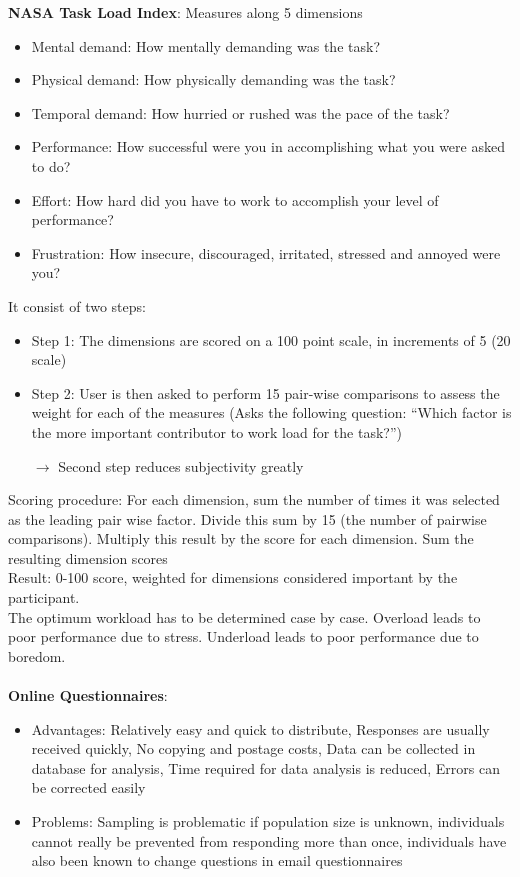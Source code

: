 \textbf{NASA Task Load Index}: Measures along 5 dimensions
\begin{itemize}
\item Mental demand: How mentally demanding was the task?
\item Physical demand: How physically demanding was the task?
\item Temporal demand: How hurried or rushed was the pace of the task?
\item Performance: How successful were you in accomplishing what you were asked to do?
\item Effort: How hard did you have to work to accomplish your level of performance?
\item Frustration: How insecure, discouraged, irritated, stressed and annoyed were you?
\end{itemize}
It consist of two steps:
\begin{itemize}
\item Step 1: The dimensions are scored on a 100 point scale, in increments of 5 (20 scale)
\item Step 2: User is then asked to perform 15 pair-wise comparisons to assess the weight for each of the measures (Asks the following question: ``Which factor is the more
important contributor to work load for the task?'')
\item[$\rightarrow$] Second step reduces subjectivity greatly
\end{itemize}
Scoring procedure: For each dimension, sum the number of times it was selected as the leading pair wise factor. Divide this sum by 15 (the number of pairwise comparisons). Multiply this result by the score for each dimension. Sum the resulting dimension scores\\
Result: 0-100 score, weighted for dimensions considered important by the participant.\\
The optimum workload has to be determined case by case. Overload leads to poor performance due to stress. Underload leads to poor performance due to boredom.\\\\
\textbf{Online Questionnaires}:
\begin{itemize}
\item Advantages: Relatively easy and quick to distribute, Responses are usually received quickly, No copying and postage costs, Data can be collected in database for analysis, Time required for data analysis is reduced, Errors can be corrected easily
\item Problems: Sampling is problematic if population size is unknown, individuals cannot really be prevented from responding more than once, individuals have also been known to change questions in email questionnaires
\end{itemize}
